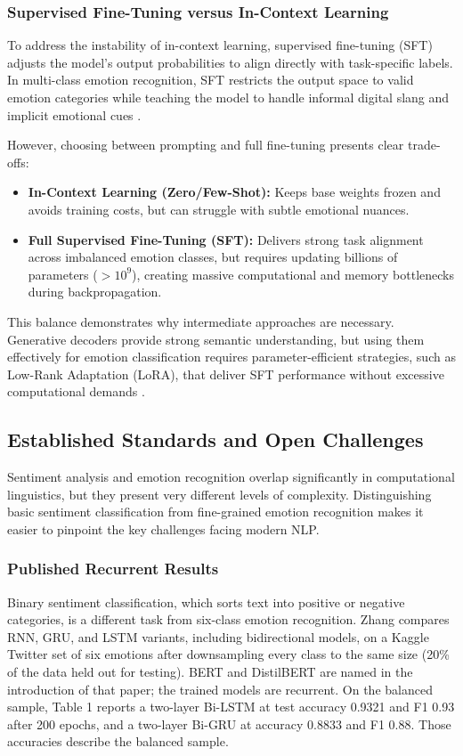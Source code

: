 \documentclass[conference]{IEEEtran}
\begin{document}
\subsubsection{Supervised Fine-Tuning versus In-Context Learning}
To address the instability of in-context learning, supervised fine-tuning (SFT) adjusts the model's output probabilities to align 
directly with task-specific labels. In multi-class emotion recognition, SFT restricts the output space to valid emotion categories 
while teaching the model to handle informal digital slang and implicit emotional cues \cite{kratzwald2018deep}.

However, choosing between prompting and full fine-tuning presents clear trade-offs:

\begin{itemize}
    \item \textbf{In-Context Learning (Zero/Few-Shot):} Keeps base weights frozen and avoids training costs, but can struggle with subtle emotional nuances.
    \item \textbf{Full Supervised Fine-Tuning (SFT):} Delivers strong task alignment across imbalanced emotion classes, but requires updating billions of parameters ($>10^9$), creating massive computational and memory bottlenecks during backpropagation.
\end{itemize}

This balance demonstrates why intermediate approaches are necessary. Generative decoders provide strong semantic understanding, 
but using them effectively for emotion classification requires parameter-efficient strategies, such as Low-Rank Adaptation (LoRA), 
that deliver SFT performance without excessive computational demands \cite{nwaiwu2025peft}.

\subsection{Established Standards and Open Challenges}
Sentiment analysis and emotion recognition overlap significantly in computational linguistics, but they present very different levels of 
complexity. Distinguishing basic sentiment classification from fine-grained emotion recognition makes it easier to pinpoint the key 
challenges facing modern NLP.

\subsubsection{Published Recurrent Results}
Binary sentiment classification, which sorts text into positive or negative categories, is a different task from six-class emotion recognition.
Zhang \cite{zhang2024comparative} compares RNN, GRU, and LSTM variants, including bidirectional models, on a Kaggle Twitter set of six emotions after downsampling every class to the same size (20\% of the data held out for testing). BERT and DistilBERT are named in the introduction of that paper; the trained models are recurrent. On the balanced sample, Table 1 reports a two-layer Bi-LSTM at test accuracy 0.9321 and F1 0.93 after 200 epochs, and a two-layer Bi-GRU at accuracy 0.8833 and F1 0.88. Those accuracies describe the balanced sample.
\end{document}
